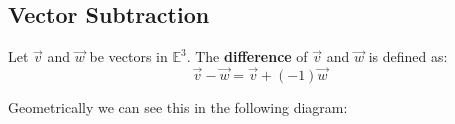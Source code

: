 \clearpage

\subsection{Vector Subtraction}
\begin{definition}
  Let $\vec{v}$ and $\vec{w}$ be vectors in $\mathbb{E}^3$. The \textbf{difference} of $\vec{v}$ and $\vec{w}$ is defined as:
  \begin{equation}
    \vec{v} - \vec{w} = \vec{v} + (-1) \vec{w}
  \end{equation}
\end{definition}
Geometrically we can see this in the following diagram:
\begin{figure}[H]

\centering
\begin{tikzpicture}[x=0.75pt,y=0.75pt,yscale=-1,xscale=1]


\end{tikzpicture}
\end{figure}
